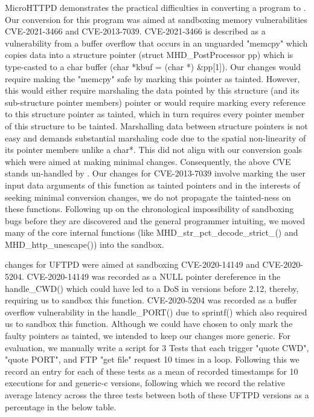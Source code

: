 MicroHTTPD demonstrates the practical difficulties in converting a program to \systemname. Our conversion for this program was aimed at sandboxing memory vulnerabilities CVE-2021-3466 and CVE-2013-7039. CVE-2021-3466 is described as a vulnerability from a buffer overflow that occurs in an unguarded "memcpy" which copies data into a structure pointer (struct MHD\_PostProcessor pp) which is type-casted to a char buffer (char *kbuf = (char *) \&pp[1]). Our changes would require making the "memcpy" safe by marking this pointer as tainted. However, this would either require marshaling the data pointed by this structure (and its sub-structure pointer members) pointer or would require marking every reference to this structure pointer as tainted, which in turn requires every pointer member of this structure to be tainted. Marshalling data between structure pointers is not easy and demands substantial marshaling code due to the spatial non-linearity of its pointer members unlike a char*. This did not align with our conversion goals which were aimed at making minimal changes. Consequently, the above CVE stands un-handled by \systemname.  Our changes for CVE-2013-7039 involve marking the user input data arguments of this function as tainted pointers and in the interests of seeking minimal conversion changes, we do not propagate the tainted-ness on these functions. Following up on the chronological impossibility of sandboxing bugs before they are discovered and the general programmer intuiting, we moved many of the core internal functions (like MHD\_str\_pct\_decode\_strict\_() and MHD\_http\_unescape()) into the sandbox. 

\systemname changes for UFTPD were aimed at sandboxing CVE-2020-14149 and CVE-2020-5204. CVE-2020-14149 was recorded as a NULL pointer dereference in the handle\_CWD() which could have led to a DoS in versions before 2.12, thereby, requiring us to sandbox this function. CVE-2020-5204 was recorded as a buffer overflow vulnerability in the handle\_PORT() due to sprintf() which also required us to sandbox this function. Although we could have chosen to only mark the faulty pointers as tainted, we intended to keep our changes more generic. For evaluation, we manually write a script for 3 Tests that each trigger "quote CWD", "quote PORT", and FTP "get file" request 10 times in a loop. Following this we record an entry for each of these tests as a mean of recorded timestamps for 10 executions for \systemname and generic-c versions, following which we record the relative average latency across the three tests between both of these UFTPD versions as a percentage in the below table.   

